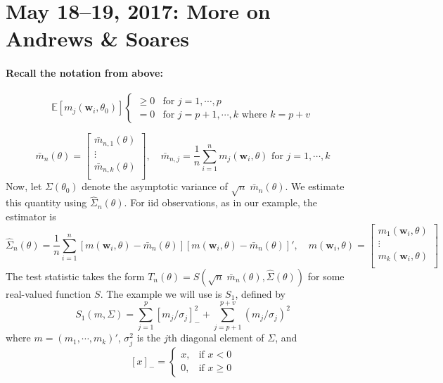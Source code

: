 \documentclass[12pt]{article}
\begin{document}
\section{May 18--19, 2017: More on Andrews \& Soares}
\paragraph{Recall the notation from above:}
\[
  \mathbb{E} \left[ m_j(\mathbf{w}_i,\theta_0) \right]
  \left\{
  \begin{array}{cc}
    \geq 0 & \mbox{for } j = 1, \cdots, p\\
    = 0 & \mbox{for } j = p + 1, \cdots,k \mbox{ where } k = p + v
  \end{array}
  \right.
\]

\[
  \bar{m}_n(\theta) = \left[
  \begin{array}{c}
    \bar{m}_{n,1}(\theta)\\
    \vdots \\
    \bar{m}_{n,k}(\theta)\\
  \end{array}
\right], \quad
\bar{m}_{n,j} = \frac{1}{n} \sum_{i=1}^{n} m_j(\mathbf{w}_i, \theta) \mbox{ for } j = 1, \cdots, k
\]
Now, let $\Sigma(\theta_0)$ denote the asymptotic variance of $\sqrt{n}\; \bar{m}_n(\theta)$.
We estimate this quantity using $\widehat{\Sigma}_n(\theta)$.
For iid observations, as in our example, the estimator is
\[
  \widehat{\Sigma}_n(\theta) = \frac{1}{n} \sum_{i=1}^n \left[ m(\mathbf{w}_i, \theta) - \bar{m}_n(\theta) \right]\left[ m(\mathbf{w}_i, \theta) - \bar{m}_n(\theta) \right]', \quad 
  m(\mathbf{w}_i, \theta) = \left[
  \begin{array}{c}
    m_1(\mathbf{w}_i, \theta)\\
    \vdots \\
    m_k(\mathbf{w}_i, \theta)\\
  \end{array}
\right]
\]
The test statistic takes the form $T_n(\theta) = S\left( \sqrt{n}\; \bar{m}_n(\theta), \widehat{\Sigma}(\theta) \right)$ for some real-valued function $S$.
The example we will use is $S_1$, defined by
\[
  S_1(m, \Sigma) = \sum_{j=1}^p [m_j/\sigma_j]^2_- + \sum_{j=p+1}^{p+v} (m_j/\sigma_j)^2
\]
where $m = (m_1, \cdots, m_k)'$, $\sigma_j^2$ is the $j$th diagonal element of $\Sigma$, and
\[
  [x]_- = \left\{
  \begin{array}{cc}
    x, & \mbox{if } x <0\\
    0, & \mbox{if } x \geq 0
  \end{array}
\right.
\]
\end{document}
